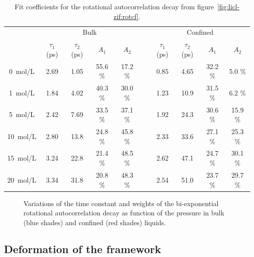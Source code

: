 \documentclass[thesis]{subfiles}
\begin{document}
\begin{table}[ht]
    \caption{Fit coefficients for the rotational autocorrelation decay from
    figure~\ref{fig:licl-zif:rotcf}.}
    \label{table:licl-zif:rotcf}
    \centering
    \renewcommand{\arraystretch}{1.3}
    \begin{tabular}{c c c c c c c c c c}
        \toprule
        \multicolumn{1}{c}{~} & \multicolumn{4}{c}{Bulk}                          &~& \multicolumn{4}{c}{Confined} \\
        \multicolumn{1}{c}{~} & $\tau_1$ (ps) & $\tau_2$ (ps) & $A_1$   & $A_2$   &~& $\tau_1$ (ps) & $\tau_2$ (ps) & $A_1$   & $A_2$   \\
        \midrule
        \SI{0}{mol/L}         &    2.69       &    1.05       & 55.6 \% & 17.2 \% &~&    0.85       &     4.65      &  32.2 \% &  5.0  \% \\
        \SI{1}{mol/L}         &    1.84       &    4.02       & 40.3 \% & 30.0 \% &~&    1.23       &     10.9      &  31.5 \% &  6.2  \% \\
        \SI{5}{mol/L}         &    2.42       &    7.69       & 33.5 \% & 37.1 \% &~&    1.92       &     24.3      &  30.6 \% &  15.9 \% \\
        \SI{10}{mol/L}        &    2.80       &    13.8       & 24.8 \% & 45.8 \% &~&    2.33       &     33.6      &  27.1 \% &  25.3 \% \\
        \SI{15}{mol/L}        &    3.24       &    22.8       & 21.4 \% & 48.5 \% &~&    2.62       &     47.1      &  24.7 \% &  30.1 \% \\
        \SI{20}{mol/L}        &    3.34       &    31.8       & 20.8 \% & 48.3 \% &~&    2.54       &     51.0      &  23.7 \% &  29.7 \% \\
        \bottomrule
    \end{tabular}
\end{table}

\begin{figure}[ht]
    \centering
    
    \caption{Variations of the time constant and weights of the bi-exponential
    rotational autocorrelation decay as function of the pressure in bulk
    (blue shades) and confined (red shades) liquids.}
    \label{fig:licl-zif:rotcf:fit:pressure}
\end{figure}

\subsection{Deformation of the framework}
\label{sec:deformation}
\end{document}
